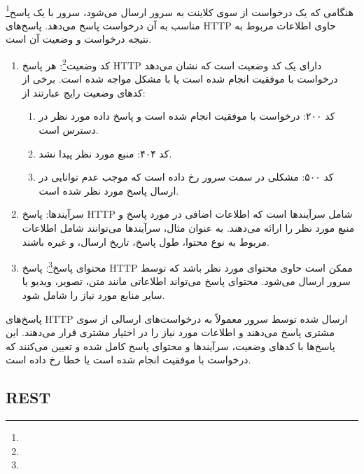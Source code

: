 \paragraph{}
{
    هنگامی که یک درخواست از سوی کلاینت به سرور ارسال می‌شود، سرور با یک پاسخ\footnote{} مناسب به آن درخواست پاسخ می‌دهد. پاسخ‌های HTTP حاوی اطلاعات مربوط به نتیجه درخواست و وضعیت آن است.
    \begin{enumerate}
        \item کد وضعیت\footnote{}: هر پاسخ HTTP دارای یک کد وضعیت است که نشان می‌دهد درخواست با موفقیت انجام شده است یا با مشکل مواجه شده است. برخی از کدهای وضعیت رایج عبارتند از:
        \begin{enumerate}
            \item کد ۲۰۰: درخواست با موفقیت انجام شده است و پاسخ داده مورد نظر در دسترس است.
            \item کد ۴۰۴: منبع مورد نظر پیدا نشد.
            \item کد ۵۰۰: مشکلی در سمت سرور رخ داده است که موجب عدم توانایی در ارسال پاسخ مورد نظر شده است.
        \end{enumerate}
        \item سرآیندها: پاسخ HTTP شامل سرآیندها است که اطلاعات اضافی در مورد پاسخ و منبع مورد نظر را ارائه می‌دهند. به عنوان مثال، سرآیندها می‌توانند شامل اطلاعات مربوط به نوع محتوا، طول پاسخ، تاریخ ارسال، و غیره باشند.
        \item محتوای پاسخ\footnote{}: پاسخ HTTP ممکن است حاوی محتوای مورد نظر باشد که توسط سرور ارسال می‌شود. محتوای پاسخ می‌تواند اطلاعاتی مانند متن، تصویر، ویدیو یا سایر منابع مورد نیاز را شامل شود.
    \end{enumerate}
    پاسخ‌های HTTP ارسال شده توسط سرور معمولاً به درخواست‌های ارسالی از سوی مشتری پاسخ می‌دهند و اطلاعات مورد نیاز را در اختیار مشتری قرار می‌دهند. این پاسخ‌ها با کدهای وضعیت، سرآیندها و محتوای پاسخ کامل شده و تعیین می‌کنند که درخواست با موفقیت انجام شده است یا خطا رخ داده است.
}

\subsection{REST}
\label{subsec:rest}
